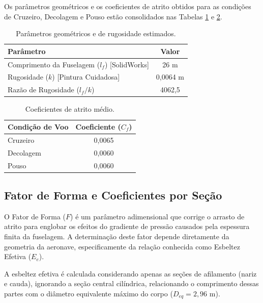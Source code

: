 Os parâmetros geométricos e os coeficientes de atrito obtidos para as condições de Cruzeiro, Decolagem e Pouso estão consolidados nas Tabelas \ref{tab:parametros_rugosidade} e \ref{tab:coef_atrito}.

\begin{table}[H]
    \centering
    \caption{Parâmetros geométricos e de rugosidade estimados.}
    \vspace{0.2cm}
    \begin{tabular}{lc}
        \toprule
        \textbf{Parâmetro} & \textbf{Valor} \\
        \midrule
        Comprimento da Fuselagem ($l_f$) [SolidWorks] & 26 m \\
        Rugosidade ($k$) [Pintura Cuidadosa] & 0,0064 m \\
        Razão de Rugosidade ($l_f / k$) & 4062,5 \\
        \bottomrule
    \end{tabular}
    \label{tab:parametros_rugosidade}
\end{table}

\begin{table}[H]
    \centering
    \caption{Coeficientes de atrito médio.}
    \vspace{0.2cm}
    \begin{tabular}{lc}
        \toprule
        \textbf{Condição de Voo} & \textbf{Coeficiente ($C_f$)} \\
        \midrule
        Cruzeiro & 0,0065 \\
        Decolagem & 0,0060 \\
        Pouso & 0,0060 \\
        \bottomrule
    \end{tabular}
    \label{tab:coef_atrito}
\end{table}

\subsection{Fator de Forma e Coeficientes por Seção}

O Fator de Forma ($F$) é um parâmetro adimensional que corrige o arrasto de atrito para englobar os efeitos do gradiente de pressão causados pela espessura finita da fuselagem. A determinação deste fator depende diretamente da geometria da aeronave, especificamente da relação conhecida como Esbeltez Efetiva ($E_e$).

A esbeltez efetiva é calculada considerando apenas as seções de afilamento (nariz e cauda), ignorando a seção central cilíndrica, relacionando o comprimento dessas partes com o diâmetro equivalente máximo do corpo ($D_{eq} = 2,96$ m).


